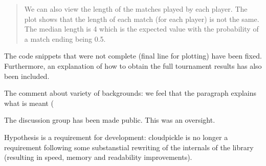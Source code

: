 \documentclass{jors}
\begin{document}
\begin{quote}
	We can also view the length of the matches played by each player. The plot
	shows that the length of each match (for each player) is not the same. The
	median length is 4 which is the expected value with the probability of a match
	ending being 0.5.
\end{quote}


The code snippets that were not complete (final line for plotting) have been
fixed. Furthermore, an explanation of how to obtain the full tournament results
has also been included.

The comment about variety of backgrounds: we feel that the paragraph explains what is meant (

The discussion group has been made public. This was an oversight.

Hypothesis is a requirement for development: cloudpickle is no longer a
requirement following some substanstial rewriting of the internals of the
library (resulting in speed, memory and readability improvements).
\end{document}
